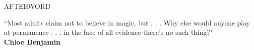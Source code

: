 \documentclass[11pt]{article}
\begin{document}
\vspace*{8\baselineskip}

\begingroup
\begin{center}
\huge AFTERWORD
\end{center}
\endgroup

\vspace*{2\baselineskip}

\begingroup
\begin{center}
``Most adults claim not to believe in magic, but . . . Why else would anyone play at permanence . . . in the face of all evidence there's no such thing?" \\ \textbf{Chloe Benjamin}
\end{center}
\endgroup
\end{document}
